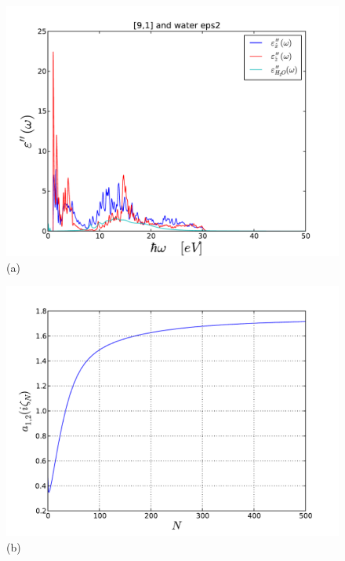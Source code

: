 \documentclass[onecolumn,letterpaper,amsmath,amssymb,floatfix,aps,superscriptaddress]{revtex4}
\begin{document}
\begin{figure}[t!]
\begin{center}
\begin{minipage}[b]{0.40\textwidth}
\begin{center}
\includegraphics[width=1.2\textwidth]{eps_91.pdf} (a)
\end{center}
\end{minipage}
\hskip 43pt
\begin{minipage}[b]{0.40\textwidth}
\begin{center}
\includegraphics[width=1.2\textwidth]{aiz_91.pdf} (b)
\end{center}
\end{minipage}

\end{center}
\end{figure}
\end{document}
